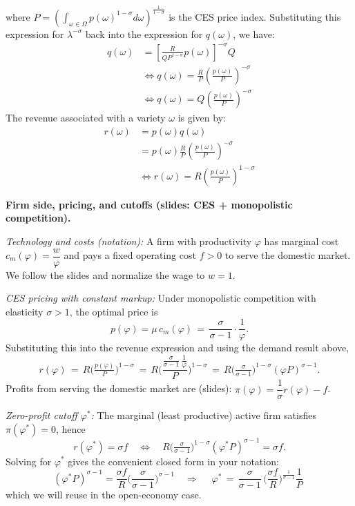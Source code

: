 \begin{solution}
\begin{align*}
    \end{align*}
    where $P = \left( \int_{\omega \in \Omega} p(\omega)^{1 - \sigma} d\omega \right)^{\frac{1}{1 - \sigma}}$ is the CES price index. Substituting this expression for $\lambda^{-\sigma}$ back into the expression for $q(\omega)$, we have:
    \begin{align*}
        q(\omega) &= \left[ \frac{R}{Q P^{1 - \sigma}} p(\omega) \right]^{-\sigma} Q \\
        &\iff q(\omega) = \frac{R}{P} \left( \frac{p(\omega)}{P} \right)^{-\sigma}\\
        &\iff q(\omega) = Q \left( \frac{p(\omega)}{P} \right)^{-\sigma}
    \end{align*}
    The revenue associated with a variety $\omega$ is given by:
    \begin{align*}
        r(\omega) &= p(\omega) q(\omega) \\
        &= p(\omega) \frac{R}{P} \left( \frac{p(\omega)}{P} \right)^{-\sigma} \\
        &\iff r(\omega) = R \left( \frac{p(\omega)}{P} \right)^{1 - \sigma}
    \end{align*}
    
    \bigskip
    	\textbf{Firm side, pricing, and cutoffs (slides: CES + monopolistic competition).}
    
    \emph{Technology and costs (notation):} A firm with productivity $\varphi$ has marginal cost $c_m(\varphi)=\dfrac{w}{\varphi}$ and pays a fixed operating cost $f>0$ to serve the domestic market. We follow the slides and normalize the wage to $w=1$.
    
    \emph{CES pricing with constant markup:} Under monopolistic competition with elasticity $\sigma>1$, the optimal price is
    \[
        p(\varphi) = \mu\, c_m(\varphi) \,=\, \frac{\sigma}{\sigma-1}\cdot\frac{1}{\varphi} .
    \]
    Substituting this into the revenue expression and using the demand result above,
    \[
        r(\varphi) \,=\, R\Big(\tfrac{p(\varphi)}{P}\Big)^{1-\sigma}
        \,=\, R\Big( \frac{\tfrac{\sigma}{\sigma-1}\,\tfrac{1}{\varphi}}{P} \Big)^{1-\sigma}
        \,=\, R\Big(\tfrac{\sigma}{\sigma-1}\Big)^{1-\sigma} (\varphi P)^{\sigma-1} .
    \]
    Profits from serving the domestic market are (slides): $\pi(\varphi) = \dfrac{1}{\sigma} r(\varphi) - f$.
    
    \emph{Zero-profit cutoff $\varphi^*$:} The marginal (least productive) active firm satisfies $\pi(\varphi^*)=0$, hence
    \[
        r(\varphi^*) = \sigma f
        \quad\Longleftrightarrow\quad
        R\Big(\tfrac{\sigma}{\sigma-1}\Big)^{1-\sigma} (\varphi^* P)^{\sigma-1} = \sigma f.
    \]
    Solving for $\varphi^*$ gives the convenient closed form in your notation:
    \[
        (\varphi^* P)^{\sigma-1} = \frac{\sigma f}{R}\Big(\frac{\sigma}{\sigma-1}\Big)^{\sigma-1}
        \quad\Rightarrow\quad
        \boxed{\;\displaystyle \varphi^* \,=\, \frac{\sigma}{\sigma-1}\,\Big(\frac{\sigma f}{R}\Big)^{\!\frac{1}{\sigma-1}} \frac{1}{P}\; } 
    \]
    which we will reuse in the open-economy case.
    

\end{solution}
